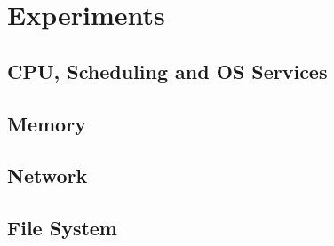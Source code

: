 \section{Experiments}


\subsection{CPU, Scheduling and OS Services}


\subsection{Memory}

\subsection{Network}

\subsection{File System}



